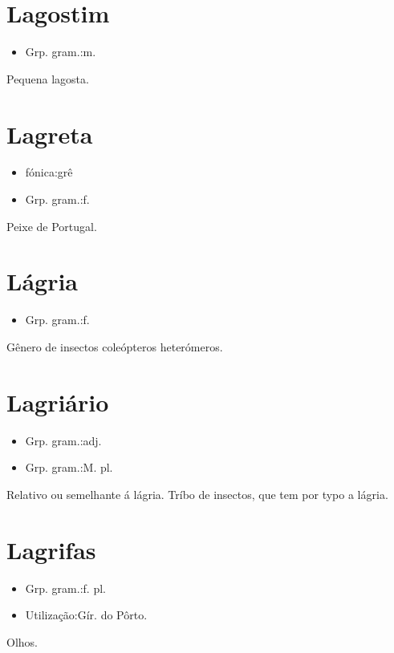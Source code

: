 \section{Lagostim}
\begin{itemize}
\item {Grp. gram.:m.}
\end{itemize}
Pequena lagosta.
\section{Lagreta}
\begin{itemize}
\item {fónica:grê}
\end{itemize}
\begin{itemize}
\item {Grp. gram.:f.}
\end{itemize}
Peixe de Portugal.
\section{Lágria}
\begin{itemize}
\item {Grp. gram.:f.}
\end{itemize}
Gênero de insectos coleópteros heterómeros.
\section{Lagriário}
\begin{itemize}
\item {Grp. gram.:adj.}
\end{itemize}
\begin{itemize}
\item {Grp. gram.:M. pl.}
\end{itemize}
Relativo ou semelhante á lágria.
Tríbo de insectos, que tem por typo a lágria.
\section{Lagrifas}
\begin{itemize}
\item {Grp. gram.:f. pl.}
\end{itemize}
\begin{itemize}
\item {Utilização:Gír. do Pôrto.}
\end{itemize}
Olhos.
